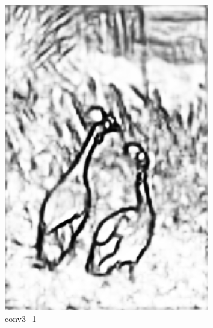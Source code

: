 \documentclass[a4paper]{ctexart}
\begin{document}
\begin{figure}[htb]
\begin{subfigure}{0.2\textwidth}
			\includegraphics[width=\linewidth]{picture/LLIE/RCF/conv3_1}
			\captionsetup{font=scriptsize}
			\caption{conv3\_1}
			\label{fig: conv3_1}	
		\end{subfigure}
		\begin{subfigure}{0.2\textwidth}

\end{subfigure}
\end{figure}
\end{document}
